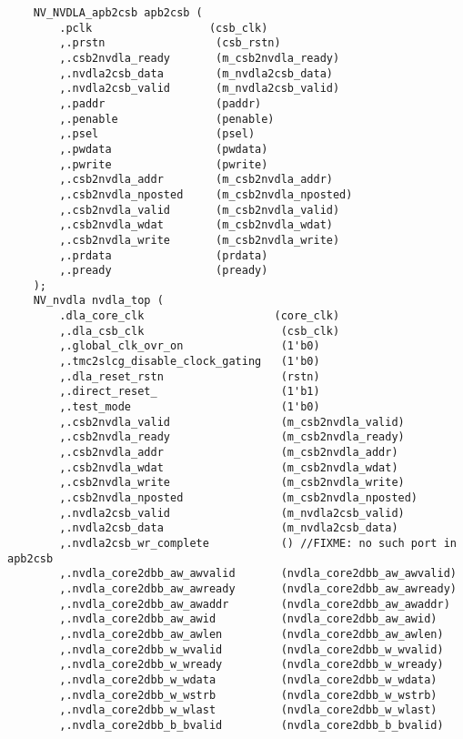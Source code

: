 \lstset{language=Verilog}
\begin{lstlisting}
    NV_NVDLA_apb2csb apb2csb (
        .pclk                  (csb_clk)
        ,.prstn                 (csb_rstn)
        ,.csb2nvdla_ready       (m_csb2nvdla_ready)
        ,.nvdla2csb_data        (m_nvdla2csb_data)
        ,.nvdla2csb_valid       (m_nvdla2csb_valid)
        ,.paddr                 (paddr)
        ,.penable               (penable)
        ,.psel                  (psel)
        ,.pwdata                (pwdata)
        ,.pwrite                (pwrite)
        ,.csb2nvdla_addr        (m_csb2nvdla_addr)
        ,.csb2nvdla_nposted     (m_csb2nvdla_nposted)
        ,.csb2nvdla_valid       (m_csb2nvdla_valid)
        ,.csb2nvdla_wdat        (m_csb2nvdla_wdat)
        ,.csb2nvdla_write       (m_csb2nvdla_write)
        ,.prdata                (prdata)
        ,.pready                (pready)
    );
    NV_nvdla nvdla_top (
        .dla_core_clk                    (core_clk)
        ,.dla_csb_clk                     (csb_clk)
        ,.global_clk_ovr_on               (1'b0)
        ,.tmc2slcg_disable_clock_gating   (1'b0)
        ,.dla_reset_rstn                  (rstn)
        ,.direct_reset_                   (1'b1)
        ,.test_mode                       (1'b0)
        ,.csb2nvdla_valid                 (m_csb2nvdla_valid)
        ,.csb2nvdla_ready                 (m_csb2nvdla_ready)
        ,.csb2nvdla_addr                  (m_csb2nvdla_addr)
        ,.csb2nvdla_wdat                  (m_csb2nvdla_wdat)
        ,.csb2nvdla_write                 (m_csb2nvdla_write)
        ,.csb2nvdla_nposted               (m_csb2nvdla_nposted)
        ,.nvdla2csb_valid                 (m_nvdla2csb_valid)
        ,.nvdla2csb_data                  (m_nvdla2csb_data)
        ,.nvdla2csb_wr_complete           () //FIXME: no such port in apb2csb
        ,.nvdla_core2dbb_aw_awvalid       (nvdla_core2dbb_aw_awvalid)
        ,.nvdla_core2dbb_aw_awready       (nvdla_core2dbb_aw_awready)
        ,.nvdla_core2dbb_aw_awaddr        (nvdla_core2dbb_aw_awaddr)
        ,.nvdla_core2dbb_aw_awid          (nvdla_core2dbb_aw_awid)
        ,.nvdla_core2dbb_aw_awlen         (nvdla_core2dbb_aw_awlen)
        ,.nvdla_core2dbb_w_wvalid         (nvdla_core2dbb_w_wvalid)
        ,.nvdla_core2dbb_w_wready         (nvdla_core2dbb_w_wready)
        ,.nvdla_core2dbb_w_wdata          (nvdla_core2dbb_w_wdata)
        ,.nvdla_core2dbb_w_wstrb          (nvdla_core2dbb_w_wstrb)
        ,.nvdla_core2dbb_w_wlast          (nvdla_core2dbb_w_wlast)
        ,.nvdla_core2dbb_b_bvalid         (nvdla_core2dbb_b_bvalid)

\end{lstlisting}
